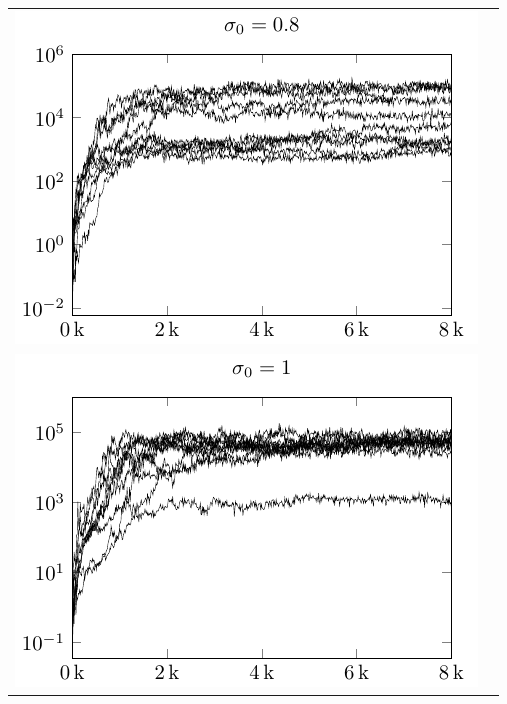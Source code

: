 \begin{tabular}{@{}l@{}l@{}}
\includegraphics[scale=1]{plots/cma_initial_sigma_0_8}\\
\includegraphics[scale=1]{plots/cma_initial_sigma_1_0} &
\end{tabular}


